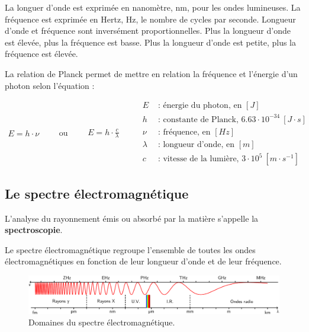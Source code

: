\documentclass[
  11pt,
  a4paper,
  openany]{book}
\begin{document}
La longuer d'onde est exprimée en nanomètre, nm, pour les ondes lumineuses. La fréquence est exprimée en Hertz, Hz, le nombre de cycles par seconde. Longueur d'onde et fréquence sont inversément proportionnelles. Plus la longueur d'onde est élevée, plus la fréquence est basse. Plus la longueur d'onde est petite, plus la fréquence est élevée.

\clearpage

La relation de Planck permet de mettre en relation la fréquence et l'énergie d'un photon selon l'équation :

\[
\begin{split}
E = h \cdot \nu
\end{split}
\qquad
\text{ou}
\qquad
\begin{split}
E = h \cdot \frac{c}{\lambda}
\end{split}
\qquad
\begin{split}
E & \text{ : énergie du photon, en } [J] \\
h & \text{ : constante de Planck, } 6.63 \cdot 10^{-34}\ [J \cdot s] \\
\nu & \text{ : fréquence, en } [Hz] \\
\lambda & \text{ : longueur d'onde, en } [m] \\
c & \text{ : vitesse de la lumière, } 3 \cdot 10^{5}\ [m \cdot s^{-1}]
\end{split}
\]

\subsection{Le spectre électromagnétique}\label{le-spectre-uxe9lectromagnuxe9tique}

L'analyse du rayonnement émis ou absorbé par la matière s'appelle la \textbf{spectroscopie}.

Le spectre électromagnétique regroupe l'ensemble de toutes les ondes électromagnétiques en fonction de leur longueur d'onde et de leur fréquence.

\begin{figure}

{\centering \includegraphics[width=0.95\linewidth]{images/domaine-spectre-electromagnetique} 

}

\caption{Domaines du spectre électromagnétique.}\label{fig:domaine-spectre-electromagnetique}
\end{figure}
\end{document}
